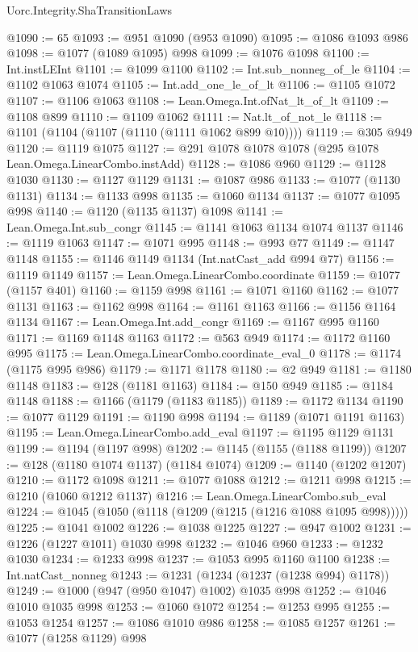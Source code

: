 \begin{lexlean}{Uorc.Integrity.ShaTransitionLaws}
\begin{coremodule}
@1090 := 65
@1093 := @951 @1090 (@953 @1090)
@1095 := @1086 @1093 @986
@1098 := @1077 (@1089 @1095) @998
@1099 := @1076 @1098
@1100 := Int.instLEInt
@1101 := @1099 @1100
@1102 := Int.sub_nonneg_of_le
@1104 := @1102 @1063 @1074
@1105 := Int.add_one_le_of_lt
@1106 := @1105 @1072
@1107 := @1106 @1063
@1108 := Lean.Omega.Int.ofNat_lt_of_lt
@1109 := @1108 @899
@1110 := @1109 @1062
@1111 := Nat.lt_of_not_le
@1118 := @1101 (@1104 (@1107 (@1110 (@1111 @1062 @899 @10))))
@1119 := @305 @949
@1120 := @1119 @1075
@1127 := @291 @1078 @1078 @1078 (@295 @1078 Lean.Omega.LinearCombo.instAdd)
@1128 := @1086 @960
@1129 := @1128 @1030
@1130 := @1127 @1129
@1131 := @1087 @986
@1133 := @1077 (@1130 @1131)
@1134 := @1133 @998
@1135 := @1060 @1134
@1137 := @1077 @1095 @998
@1140 := @1120 (@1135 @1137) @1098
@1141 := Lean.Omega.Int.sub_congr
@1145 := @1141 @1063 @1134 @1074 @1137
@1146 := @1119 @1063
@1147 := @1071 @995
@1148 := @993 @77
@1149 := @1147 @1148
@1155 := @1146 @1149 @1134 (Int.natCast_add @994 @77)
@1156 := @1119 @1149
@1157 := Lean.Omega.LinearCombo.coordinate
@1159 := @1077 (@1157 @401)
@1160 := @1159 @998
@1161 := @1071 @1160
@1162 := @1077 @1131
@1163 := @1162 @998
@1164 := @1161 @1163
@1166 := @1156 @1164 @1134
@1167 := Lean.Omega.Int.add_congr
@1169 := @1167 @995 @1160
@1171 := @1169 @1148 @1163
@1172 := @563 @949
@1174 := @1172 @1160 @995
@1175 := Lean.Omega.LinearCombo.coordinate_eval_0
@1178 := @1174 (@1175 @995 @986)
@1179 := @1171 @1178
@1180 := @2 @949
@1181 := @1180 @1148
@1183 := @128 (@1181 @1163)
@1184 := @150 @949
@1185 := @1184 @1148
@1188 := @1166 (@1179 (@1183 @1185))
@1189 := @1172 @1134
@1190 := @1077 @1129
@1191 := @1190 @998
@1194 := @1189 (@1071 @1191 @1163)
@1195 := Lean.Omega.LinearCombo.add_eval
@1197 := @1195 @1129 @1131
@1199 := @1194 (@1197 @998)
@1202 := @1145 (@1155 (@1188 @1199))
@1207 := @128 (@1180 @1074 @1137) (@1184 @1074)
@1209 := @1140 (@1202 @1207)
@1210 := @1172 @1098
@1211 := @1077 @1088
@1212 := @1211 @998
@1215 := @1210 (@1060 @1212 @1137)
@1216 := Lean.Omega.LinearCombo.sub_eval
@1224 := @1045 (@1050 (@1118 (@1209 (@1215 (@1216 @1088 @1095 @998)))))
@1225 := @1041 @1002
@1226 := @1038 @1225
@1227 := @947 @1002
@1231 := @1226 (@1227 @1011) @1030 @998
@1232 := @1046 @960
@1233 := @1232 @1030
@1234 := @1233 @998
@1237 := @1053 @995 @1160 @1100
@1238 := Int.natCast_nonneg
@1243 := @1231 (@1234 (@1237 (@1238 @994) @1178))
@1249 := @1000 (@947 (@950 @1047) @1002) @1035 @998
@1252 := @1046 @1010 @1035 @998
@1253 := @1060 @1072
@1254 := @1253 @995
@1255 := @1053 @1254
@1257 := @1086 @1010 @986
@1258 := @1085 @1257
@1261 := @1077 (@1258 @1129) @998

\end{coremodule}
\end{lexlean}
